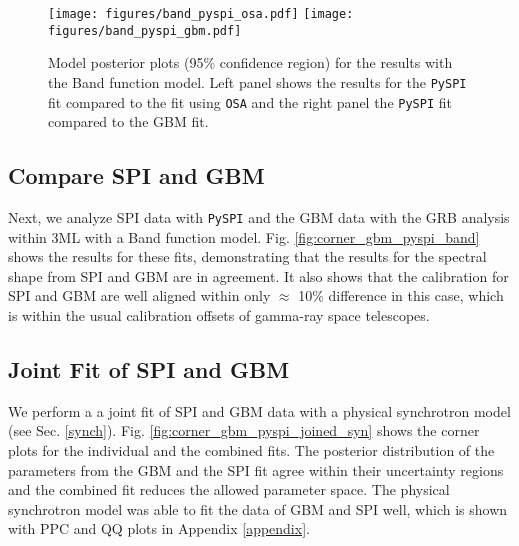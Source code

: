 \documentclass[twocolumn,traditabstract]{aa}
\begin{document}
\begin{figure*}
  \begin{centering}
    \texttt{[image: figures/band\_pyspi\_osa.pdf]}
    \texttt{[image: figures/band\_pyspi\_gbm.pdf]}
    \caption{Model posterior plots (95\% confidence region) for the results with the Band function model. Left panel shows the results for the {\tt PySPI} fit compared to the fit using {\tt OSA} and the right panel the {\tt PySPI} fit compared to the GBM fit.}
    \label{fig:model_plot_band}
  \end{centering}
\end{figure*}

\subsection{Compare SPI and GBM}
\label{pyspi_gbm}
Next, we analyze SPI data with {\tt PySPI} and the GBM data with the GRB analysis within 3ML with a Band function model. Fig. \ref{fig:corner_gbm_pyspi_band} shows the results for these fits, demonstrating that the results for the spectral shape from SPI and GBM are in agreement. It also shows that the calibration for SPI and GBM are well aligned within only $\approx$ 10\% difference in this case, which is within the usual calibration offsets of gamma-ray space telescopes.

\subsection{Joint Fit of SPI and GBM}
\label{pyspi_gbm_joined}
We perform a a joint fit of SPI and GBM data with a physical synchrotron model (see Sec. \ref{synch}). Fig. \ref{fig:corner_gbm_pyspi_joined_syn} shows the corner plots for the individual and the combined fits. The posterior distribution of the parameters from the GBM and the SPI fit agree within their uncertainty regions and the combined fit reduces the allowed parameter space. The physical synchrotron model was able to fit the data of GBM and SPI well, which is shown with PPC and QQ plots in Appendix \ref{appendix}.
\end{document}

